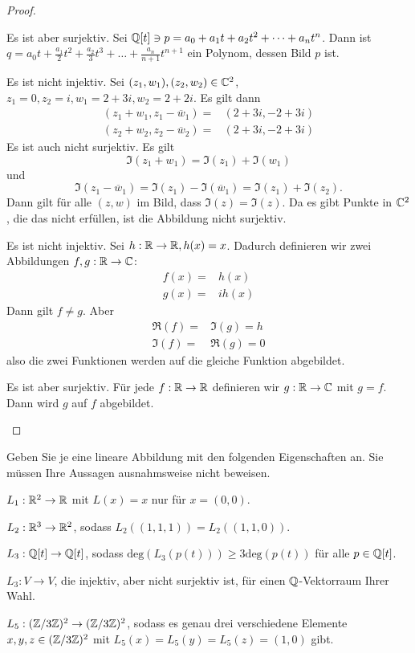 \begin{proof}
\begin{parts}
		Es ist aber surjektiv. Sei $\mathbb{Q}[t]\ni p=a_0+a_1t+a_2t^2+\dots + a_nt^n$. Dann ist $q=a_0t+\frac{a_1}{2}t^2+\frac{a_2}{3}t^3+\dots + \frac{a_n}{n+1}t^{n+1}$ ein Polynom, dessen Bild $p$ ist.
	\item Es ist nicht injektiv. Sei $(z_1,w_1),(z_2,w_2)\in \mathbb{C}^2$, $z_1=0,z_2=i,w_1=2+3i,w_2=2+2i$. Es gilt dann
		\begin{align*}
			(z_1+w_1,z_1-\overline{w}_1)=&(2+3i,-2+3i)\\
			(z_2+w_2,z_2-\overline{w}_2)=&(2+3i,-2+3i)
		\end{align*}
		Es ist auch nicht surjektiv. Es gilt
		\[
		\Im(z_1+w_1)=\Im(z_1)+\Im(w_1)
	\]
	und
	\[
	\Im(z_1-\overline{w}_1)=\Im(z_1)-\Im(\overline{w}_1)=\Im(z_1)+\Im(z_2)
	.\] 
	Dann gilt f\"{u}r alle $(z,w)$ im Bild, dass $\Im(z)=\Im(z)$. Da es gibt Punkte in $\mathbb{C}^2$, die das nicht erfüllen, ist die Abbildung nicht surjektiv.
\item Es ist nicht injektiv. Sei $h:\mathbb{R}\to \mathbb{R}, h(x)=x$. Dadurch definieren wir zwei Abbildungen $f,g:\mathbb{R}\to \mathbb{C}$:
	\begin{align*}
		f(x)=&h(x)\\
		g(x)=&i h(x)
	\end{align*}
	Dann gilt $f\neq g$. Aber
	\begin{align*}
		\Re(f)=&\Im(g)=h\\
		\Im(f)=&\Re(g)=0
	\end{align*}
	also die zwei Funktionen werden auf die gleiche Funktion abgebildet.

	Es ist aber surjektiv. F\"{u}r jede $f:\mathbb{R}\to \mathbb{R}$ definieren wir $g:\mathbb{R}\to \mathbb{C}$ mit $g=f$. Dann wird $g$ auf $f$ abgebildet.\qedhere
	\end{parts}
\end{proof}
\begin{Problem}
Geben Sie je eine lineare Abbildung mit den folgenden Eigenschaften an. Sie müssen Ihre Aussagen ausnahmsweise nicht beweisen. 	
\begin{parts}
\item $L_1:\mathbb{R}^2\to \mathbb{R}$ mit $L(x)=x$ nur f\"{u}r $x=(0,0)$.
\item $L_2:\mathbb{R}^3\to \mathbb{R}^2$, sodass $L_2((1,1,1))=L_2((1,1,0))$.
\item $L_3:\mathbb{Q}[t]\to \mathbb{Q}[t]$, sodass $\text{deg}(L_3(p(t)))\ge 3\text{deg}(p(t))$ f\"{u}r alle $p\in \mathbb{Q}[t]$.
\item $L_3:V \to V$, die injektiv, aber nicht surjektiv ist, für einen $\mathbb{Q}$-Vektorraum Ihrer Wahl. 
\item $L_5:(\mathbb{Z} / 3\mathbb{Z})^2\to (\mathbb{Z} / 3\mathbb{Z})^2$, sodass es genau drei verschiedene Elemente $x,y,z\in (\mathbb{Z} / 3\mathbb{Z})^2$ mit $L_5(x)=L_5(y)=L_5(z)=(1,0)$ gibt. 
\end{parts}
\end{Problem}

